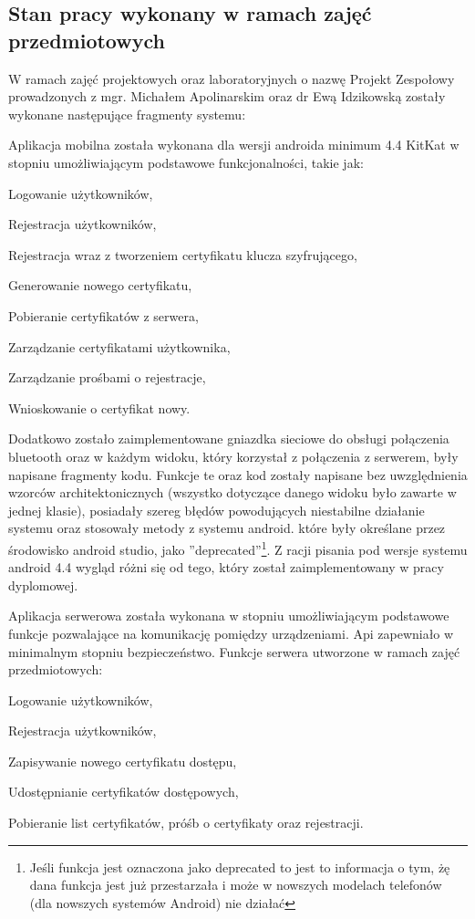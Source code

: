 \newpage
\subsection{Stan pracy wykonany w ramach zajęć \newline przedmiotowych} \label{sec:Stan pracy wykonany w ramach zajęć przedmiotowych}
W ramach zajęć projektowych oraz laboratoryjnych o nazwę Projekt Zespołowy prowadzonych z mgr. Michałem Apolinarskim oraz dr Ewą Idzikowską zostały wykonane następujące fragmenty systemu:
	
	Aplikacja mobilna została wykonana dla wersji androida minimum 4.4 KitKat w stopniu umożliwiającym podstawowe funkcjonalności, takie jak:
	\begin{itemize*}
		\item Logowanie użytkowników,
		\item Rejestracja użytkowników,
		\item Rejestracja wraz z tworzeniem certyfikatu klucza szyfrującego,
		\item Generowanie nowego certyfikatu,
		\item Pobieranie certyfikatów z serwera,
		\item Zarządzanie certyfikatami użytkownika,
		\item Zarządzanie prośbami o rejestracje,
		\item Wnioskowanie o certyfikat nowy.
	\end{itemize*}

		Dodatkowo zostało zaimplementowane gniazdka sieciowe do obsługi połączenia bluetooth oraz w każdym widoku, który korzystał z połączenia z serwerem, były napisane fragmenty kodu. Funkcje te oraz kod zostały napisane bez uwzględnienia wzorców architektonicznych (wszystko dotyczące danego widoku było zawarte w jednej klasie), posiadały szereg błędów powodujących niestabilne działanie systemu oraz stosowały metody z systemu android. które były określane przez środowisko android studio, jako ''deprecated''\footnote{ Jeśli funkcja jest oznaczona jako deprecated to jest to informacja o tym, żę dana funkcja jest już przestarzała i może w nowszych modelach telefonów (dla nowszych systemów Android) nie działać}. Z racji pisania pod wersje systemu android 4.4 wygląd różni się od tego, który został zaimplementowany w pracy dyplomowej.

   Aplikacja serwerowa została wykonana w stopniu umożliwiającym podstawowe funkcje pozwalające na komunikację pomiędzy urządzeniami. Api zapewniało w minimalnym stopniu bezpieczeństwo. Funkcje serwera utworzone w ramach zajęć przedmiotowych:
   	\begin{itemize*}
   		\item Logowanie użytkowników,
   		\item Rejestracja użytkowników,
   		\item Zapisywanie nowego certyfikatu dostępu,
   		\item Udostępnianie certyfikatów dostępowych,
   		\item Pobieranie list certyfikatów, próśb o certyfikaty oraz rejestracji.
   	\end{itemize*}
   

